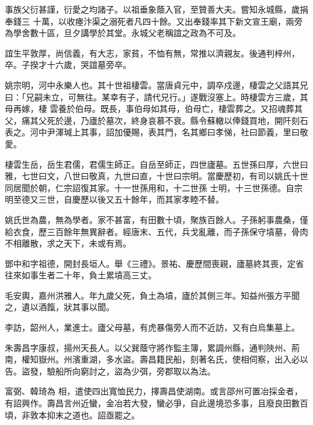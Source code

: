\begin{pinyinscope}
 事族父衍甚謹，衍愛之均諸子。以祖垂象蔭入官，至贊善大夫。嘗知永城縣，歲捐奉錢三
 十萬，以收瘞汴渠之溺死者凡四十餘。又出奉錢率其下新文宣王廟，兩旁為學舍數十區，旦夕講學於其堂。永城父老稱誼之政為不可及。



 誼生平敦厚，尚信義，有大志，家貧，不恤有無，常推以濟親友。後通判梓州，卒。子揆才十六歲，哭誼墓旁卒。



 姚宗明，河中永樂人也。其十世祖棲雲。當唐貞元中，調卒戍邊，棲雲之父語其兄曰：「兄嗣未立，可無往。某幸有子，請代兄行。」遂戰沒塞上。時棲雲方三歲，其母再嫁，棲
 雲養於伯母。既長，事伯母如其母，伯母亡，棲雲葬之。又招魂葬其父，痛其父死於邊，乃廬於墓次，終身哀慕不衰。縣令蘇轍以俸錢買地，開阡刻石表之。河中尹渾瑊上其事，詔加優賜，表其門，名其鄉曰孝悌，社曰節義，里曰敬愛。



 棲雲生岳，岳生君儒，君儒生師正。自岳至師正，四世廬墓。五世孫曰厚，六世曰雅，七世曰文，八世曰敬真，九世曰直，十世曰宗明。當慶歷初，有司以姚氏十世同居聞於朝，仁宗詔復其家。十一世孫用和，十二世孫
 士明，十三世孫德。自宗明至德又三世，自慶歷以後又五十餘年，而其家孝睦不替。



 姚氏世為農，無為學者。家不甚富，有田數十頃，聚族百餘人。子孫躬事農桑，僅給衣食，歷三百餘年無異辭者。經唐末、五代，兵戈亂離，而子孫保守墳墓，骨肉不相離散，求之天下，未或有焉。



 鄧中和字祖德，開封長垣人。舉《三禮》。景祐、慶歷間喪親，廬墓終其喪，定省往來如事生者二十年，負土累墳高三丈。



 毛安輿，嘉州洪雅人。年九歲父死，負土為墳，廬於其側三年。知益州張方平聞之，遺以酒餼，狀其事以聞。



 李訪，韶州人，業進士。廬父母墓，有虎暴傷旁人而不近訪，又有白烏集墓上。



 朱壽昌字康叔，揚州天長人。以父巽蔭守將作監主簿，累調州縣，通判陜州、荊南，權知嶽州。州濱重湖，多水盜。壽昌籍民船，刻著名氏，使相伺察，出入必以告。盜發，驗船所向窮討之，盜為少弭，旁郡取以為法。



 富弼、韓琦為
 相，遣使四出寬恤民力，擇壽昌使湖南。或言邵州可置冶採金者，有詔興作。壽昌言州近蠻，金冶若大發，蠻必爭，自此邊境恐多事，且廢良田數百頃，非敦本抑末之道也。詔亟罷之。




\end{pinyinscope}
